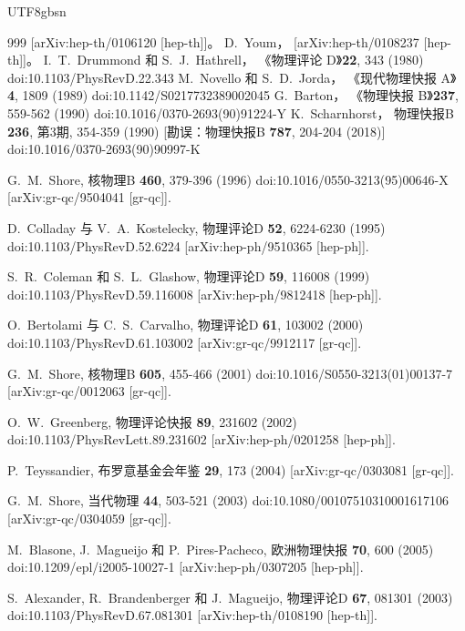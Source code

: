 \documentclass[jkps,preprint,fleqn]{revtex4}
\begin{document}
\begin{CJK*}{UTF8}{gbsn}
\begin{thebibliography}{999}
[arXiv:hep-th/0106120 [hep-th]]。  
D.~Youm，  
[arXiv:hep-th/0108237 [hep-th]]。  
I.~T.~Drummond 和 S.~J.~Hathrell，  
《物理评论 D》\textbf{22}, 343 (1980)  
doi:10.1103/PhysRevD.22.343  
M.~Novello 和 S.~D.~Jorda，  
《现代物理快报 A》\textbf{4}, 1809 (1989)  
doi:10.1142/S0217732389002045  
G.~Barton，  
《物理快报 B》\textbf{237}, 559-562 (1990)  
doi:10.1016/0370-2693(90)91224-Y  
K.~Scharnhorst，
物理快报B \textbf{236}, 第3期, 354-359 (1990)  
[勘误：物理快报B \textbf{787}, 204-204 (2018)]  
doi:10.1016/0370-2693(90)90997-K  

G.~M.~Shore,  
核物理B \textbf{460}, 379-396 (1996)  
doi:10.1016/0550-3213(95)00646-X  
[arXiv:gr-qc/9504041 [gr-qc]].  

D.~Colladay 与 V.~A.~Kostelecky,  
物理评论D \textbf{52}, 6224-6230 (1995)  
doi:10.1103/PhysRevD.52.6224  
[arXiv:hep-ph/9510365 [hep-ph]].  

S.~R.~Coleman 和 S.~L.~Glashow,  
物理评论D \textbf{59}, 116008 (1999)  
doi:10.1103/PhysRevD.59.116008  
[arXiv:hep-ph/9812418 [hep-ph]].  

O.~Bertolami 与 C.~S.~Carvalho,  
物理评论D \textbf{61}, 103002 (2000)  
doi:10.1103/PhysRevD.61.103002  
[arXiv:gr-qc/9912117 [gr-qc]].  

G.~M.~Shore,  
核物理B \textbf{605}, 455-466 (2001)  
doi:10.1016/S0550-3213(01)00137-7  
[arXiv:gr-qc/0012063 [gr-qc]].  

O.~W.~Greenberg,  
物理评论快报 \textbf{89}, 231602 (2002)  
doi:10.1103/PhysRevLett.89.231602  
[arXiv:hep-ph/0201258 [hep-ph]].  

P.~Teyssandier,  
布罗意基金会年鉴 \textbf{29}, 173 (2004)  
[arXiv:gr-qc/0303081 [gr-qc]].  

G.~M.~Shore,  
当代物理 \textbf{44}, 503-521 (2003)  
doi:10.1080/00107510310001617106  
[arXiv:gr-qc/0304059 [gr-qc]].  

M.~Blasone, J.~Magueijo 和 P.~Pires-Pacheco,  
欧洲物理快报 \textbf{70}, 600 (2005)  
doi:10.1209/epl/i2005-10027-1  
[arXiv:hep-ph/0307205 [hep-ph]].  

S.~Alexander, R.~Brandenberger 和 J.~Magueijo,  
物理评论D \textbf{67}, 081301 (2003)  
doi:10.1103/PhysRevD.67.081301  
[arXiv:hep-th/0108190 [hep-th]].  


\end{thebibliography}
\end{CJK*}
\end{document}
